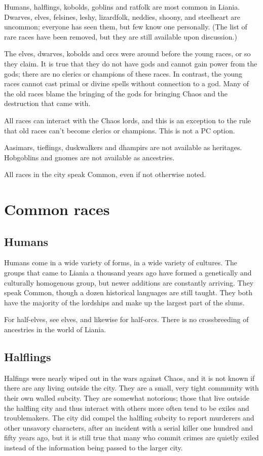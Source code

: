 \documentclass{report}
\begin{document}
Humans, halflings, kobolds, goblins and rat\-folk are most common in Liania.
Dwarves, elves, felsines, leshy, lizardfolk, neddies, shoony, and steelheart are
uncommon; everyone has seen them, but few know one personally. (The list of
rare races have been removed, but they are still available upon discussion.)

The elves, dwarves, kobolds and orcs were around before the young races, or so they claim.
It is true that they do not have gods and cannot gain power from the gods; there
are no clerics or champions of these races. In contrast, the young races cannot
cast primal or divine spells without connection to a god. Many of the old races
blame the bringing of the gods for bringing Chaos and the destruction that came with.

All races can interact with the Chaos lords, and this is an exception to the
rule that old races can't become clerics or champions. This is not a PC option.

Aasimars, tieflings, duskwalkers and dhampirs are not available as heritages.
Hobgoblins and gnomes are not available as ancestries.

All races in the city speak Common, even if not otherwise noted.

\section {Common races}

\subsection{Humans}

Humans come in a wide variety of forms, in a wide variety of cultures. The
groups that came to Liania a thousand years ago have formed a genetically and
culturally homogenous group, but newer additions are constantly arriving. They
speak Common, though a dozen historical languages are still taught. They both
have the majority of the lordships and make up the largest part of the slums.

For half-elves, see elves, and likewise for half-orcs. There is no crossbreeding
of ancestries in the world of Liania.

\subsection{Halflings}

Halfings were nearly wiped out in the wars against Chaos, and it is not known
if there are any living outside the city. They are a small, very tight community
with their own walled subcity. They are somewhat notorious; those that live
outside the halfling city and thus interact with others more often tend to be
exiles and troublemakers. The city did compel the halfling subcity to report
murderers and other unsavory characters, after an incident with a serial killer
one hundred and fifty years ago, but it is still true that many who commit crimes
are quietly exiled instead of the information being passed to the larger city.
\end{document}
